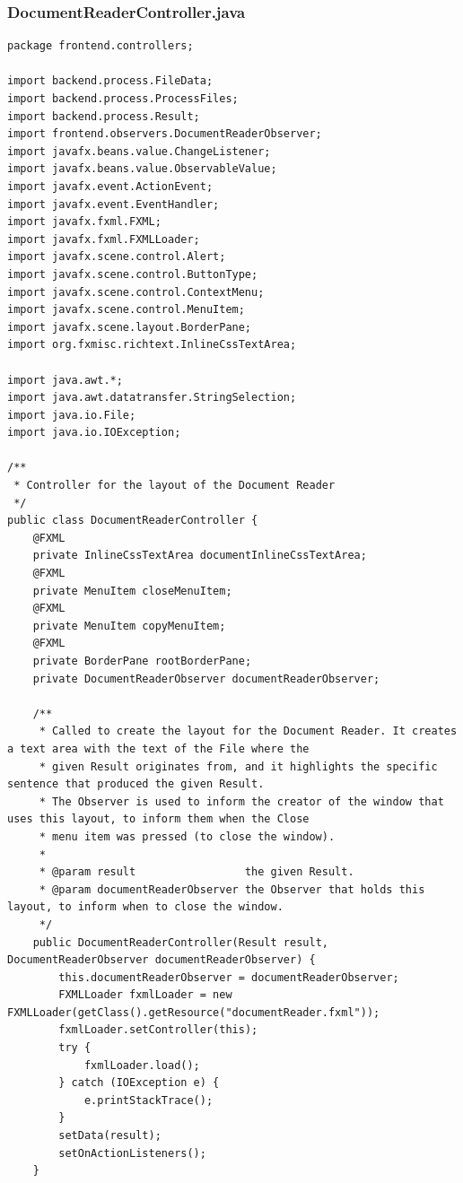 \subsubsection{DocumentReaderController.java}
\begin{lstlisting}
package frontend.controllers;

import backend.process.FileData;
import backend.process.ProcessFiles;
import backend.process.Result;
import frontend.observers.DocumentReaderObserver;
import javafx.beans.value.ChangeListener;
import javafx.beans.value.ObservableValue;
import javafx.event.ActionEvent;
import javafx.event.EventHandler;
import javafx.fxml.FXML;
import javafx.fxml.FXMLLoader;
import javafx.scene.control.Alert;
import javafx.scene.control.ButtonType;
import javafx.scene.control.ContextMenu;
import javafx.scene.control.MenuItem;
import javafx.scene.layout.BorderPane;
import org.fxmisc.richtext.InlineCssTextArea;

import java.awt.*;
import java.awt.datatransfer.StringSelection;
import java.io.File;
import java.io.IOException;

/**
 * Controller for the layout of the Document Reader
 */
public class DocumentReaderController {
    @FXML
    private InlineCssTextArea documentInlineCssTextArea;
    @FXML
    private MenuItem closeMenuItem;
    @FXML
    private MenuItem copyMenuItem;
    @FXML
    private BorderPane rootBorderPane;
    private DocumentReaderObserver documentReaderObserver;

    /**
     * Called to create the layout for the Document Reader. It creates a text area with the text of the File where the
     * given Result originates from, and it highlights the specific sentence that produced the given Result.
     * The Observer is used to inform the creator of the window that uses this layout, to inform them when the Close
     * menu item was pressed (to close the window).
     *
     * @param result                 the given Result.
     * @param documentReaderObserver the Observer that holds this layout, to inform when to close the window.
     */
    public DocumentReaderController(Result result, DocumentReaderObserver documentReaderObserver) {
        this.documentReaderObserver = documentReaderObserver;
        FXMLLoader fxmlLoader = new FXMLLoader(getClass().getResource("documentReader.fxml"));
        fxmlLoader.setController(this);
        try {
            fxmlLoader.load();
        } catch (IOException e) {
            e.printStackTrace();
        }
        setData(result);
        setOnActionListeners();
    }



\end{lstlisting}
